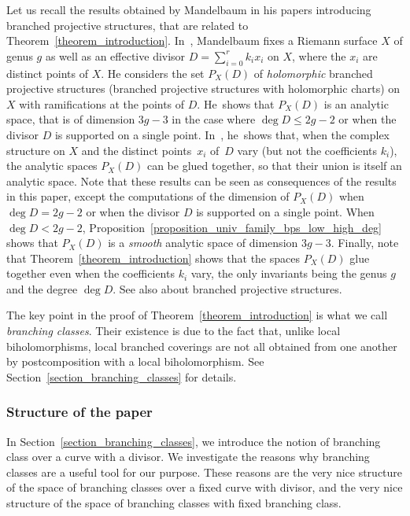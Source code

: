 \documentclass[JEP,XML,SOM,Unicode,NoEqCountersInSection,published]{cedram}
\theoremstyle{definition}
\theoremstyle{plain}
\begin{document}
Let us recall the results obtained by Mandelbaum in his papers introducing branched projective structures, that are related to Theorem~\ref{theorem_introduction}. In~\cite{mandelbaum_1}, Mandelbaum fixes a Riemann surface $X$ of genus $g$ as well as an effective divisor $D = \sum_{i=0}^r k_i x_i$ on $X$, where the $x_i$ are distinct points of $X$.
He considers the set $P_X(D)$ of \emph{holomorphic} branched projective structures (\ie branched projective structures with holomorphic charts) on $X$ with ramifications at the points of $D$.
He~shows that $P_X(D)$ is an analytic space, that is of dimension $3g-3$ in the case where $\deg D \le 2g-2$ or when the divisor $D$ is supported on a single point.
In~\cite{mandelbaum_2}, he~shows that, when the complex structure on $X$ and the distinct points~$x_i$ of~$D$ vary (but not the coefficients $k_i$), the analytic spaces $P_X(D)$ can be glued together, so that their union is itself an analytic space.
Note that these results can be seen as consequences of the results in this paper, except the computations of the dimension of $P_X(D)$ when $\deg D = 2g-2$ or when the divisor $D$ is supported on a single point.
When $\deg D < 2g-2$, Proposition~\ref{proposition_univ_family_bps_low_high_deg} shows that $P_X(D)$ is a \emph{smooth} analytic space of dimension $3g-3$.
Finally, note that Theorem~\ref{theorem_introduction} shows that the spaces $P_X(D)$ glue together even when the coefficients $k_i$ vary, the only invariants being the genus $g$ and the degree $\deg D$.
See also \cite{mandelbaum_3} about branched projective structures.

The key point in the proof of Theorem~\ref{theorem_introduction} is what we call \emph{branching classes}.
Their existence is due to the fact that, unlike local biholomorphisms, local branched coverings are not all obtained from one another by postcomposition with a local biholomorphism.
See Section~\ref{section_branching_classes} for details.\enlargethispage{\baselineskip}%

\subsubsection*{Structure of the paper}

In Section~\ref{section_branching_classes}, we introduce the notion of branching class over a curve with a divisor.
We investigate the reasons why branching classes are a useful tool for our purpose.
These reasons are the very nice structure of the space of branching classes over a fixed curve with divisor, and the very nice structure of the space of branching classes with fixed branching class.
\end{document}
